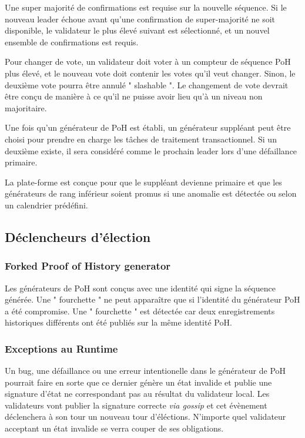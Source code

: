 \documentclass[12pt]{article}
\begin{document}
Une super majorité de confirmations est requise sur la nouvelle séquence. Si le nouveau leader échoue avant qu'une confirmation de super-majorité ne soit disponible, le validateur le plus élevé suivant est sélectionné, et un nouvel ensemble de confirmations est requis.

Pour changer de vote, un validateur doit voter à un compteur de séquence PoH plus élevé, et le nouveau vote doit contenir les votes qu'il veut changer. Sinon, le deuxième vote pourra être annulé " slashable ". Le changement de vote devrait être conçu de manière à ce qu'il ne puisse avoir lieu qu'à un niveau non majoritaire.

Une fois qu'un générateur de PoH est établi, un générateur suppléant peut être choisi pour prendre en charge les tâches de traitement transactionnel. Si un deuxième existe, il sera considéré comme le prochain leader lors d'une défaillance primaire.

La plate-forme est conçue pour que le suppléant devienne primaire et que les générateurs de rang inférieur soient promus si une anomalie est détectée ou selon un calendrier prédéfini.
\subsection{Déclencheurs d'élection}
\subsubsection{Forked Proof of History generator}

Les générateurs de PoH sont conçus avec une identité qui signe la séquence générée. Une " fourchette " ne peut apparaître que si l'identité du générateur PoH a été compromise. Une " fourchette " est détectée car deux enregistrements historiques différents ont été publiés sur la même identité PoH.

\subsubsection{Exceptions au Runtime}
Un bug, une défaillance ou une erreur intentionelle dans le générateur de PoH pourrait faire en sorte que ce dernier génère un état invalide et publie une signature d'état ne correspondant pas au résultat du validateur local.  Les validateurs vont publier la signature correcte \textit{via gossip} et cet évènement déclenchera à son tour un nouveau tour d'éléctions. N'importe quel validateur acceptant un état invalide se verra couper de ses obligations.
\end{document}
